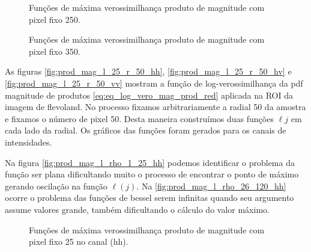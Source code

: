 \begin{figure*}[hbt]
	\centering
     \caption{Funções de máxima verossimilhança produto de magnitude com pixel fixo 250.}
     \label{fig:prod_mag_l_250_r_35} 
   \end{figure*}
   \begin{figure*}[hbt]
	\centering
     \caption{Funções de máxima verossimilhança produto de magnitude com pixel fixo 350.}
     \label{fig:prod_mag_l_350_r_35} 
   \end{figure*}

As figuras \eqref{fig:prod_mag_l_25_r_50_hh}, \eqref{fig:prod_mag_l_25_r_50_hv} e \eqref{fig:prod_mag_l_25_r_50_vv} mostram a função de log-verossimilhança da pdf magnitude de produtos \eqref{eq:eq_log_vero_mag_prod_red} aplicada na ROI da imagem de flevoland. No processo fixamos arbitrariamente a radial 50 da amostra e fixamos o número de pixel 50. Desta maneira construímos duas funções $\ell{j}$ em cada lado da radial. Os gráficos das funções foram gerados para os canais de intensidades.



Na figura \eqref{fig:prod_mag_l_rho_1_25_hh} podemos identificar o problema da função ser plana dificultando muito o processo de encontrar o ponto de máximo gerando oscilação na função $\ell(j)$. Na \eqref{fig:prod_mag_l_rho_26_120_hh} ocorre o problema das funções de bessel serem infinitas quando seu argumento assume valores grande, também dificultando o cálculo do valor máximo.  

\begin{figure*}[hbt]
	\centering
     \caption{Funções de máxima verossimilhança produto de magnitude com pixel fixo 25 no canal (hh).}
     \label{fig:prod_mag_l_25_r_50_hh} 
   \end{figure*}
   

